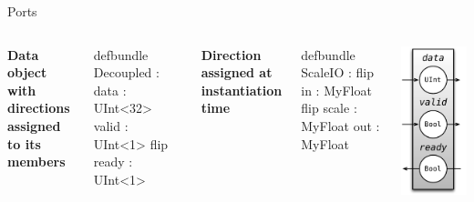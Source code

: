 \documentclass[xcolor=pdflatex,dvipsnames,table]{beamer}
\begin{document}
\begin{frame}[fragile]{Ports}

\begin{columns}

\textbf{Data object with directions assigned to its members}

\begin{stanza}
defbundle Decoupled :
  data : UInt<32>
  valid : UInt<1>
  flip ready : UInt<1>
\end{stanza}

\textbf{Direction assigned at instantiation time}

\begin{stanza}
defbundle ScaleIO :
  flip in : MyFloat
  flip scale : MyFloat
  out : MyFloat
\end{stanza}


\begin{center}
\includegraphics[height=0.9\textheight]{figs/FIFOIO.pdf} 
\end{center}

\end{columns}

\end{frame}
\end{document}
